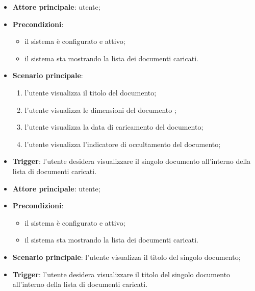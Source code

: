 \documentclass[10pt, a4paper]{article}
\begin{document}
    \begin{itemize}
        \item \textbf{Attore principale}: utente;
        \item \textbf{Precondizioni}:
            \begin{itemize}
                \item il sistema è configurato e attivo;
                \item il sistema sta mostrando la lista dei documenti caricati.
            \end{itemize}
        \item \textbf{Scenario principale}:
            \begin{enumerate}
                \item l'utente visualizza il titolo del documento;
                \item l'utente visualizza le dimensioni del documento ;
                \item l'utente visualizza la data di caricamento del documento;
                \item l'utente visualizza l'indicatore di occultamento del documento;
            \end{enumerate}
        \item \textbf{Trigger}: l’utente desidera visualizzare il singolo documento all’interno della lista di documenti caricati.
    \end{itemize}

    \begin{itemize}
        \item \textbf{Attore principale}: utente;
        \item \textbf{Precondizioni}:
            \begin{itemize}
                \item il sistema è configurato e attivo;
                \item il sistema sta mostrando la lista dei documenti caricati.
            \end{itemize}
        \item \textbf{Scenario principale}: l'utente visualizza il titolo del singolo documento;
        \item \textbf{Trigger}: l’utente desidera visualizzare il titolo del singolo documento all’interno della lista di documenti caricati.
    \end{itemize}
\end{document}
